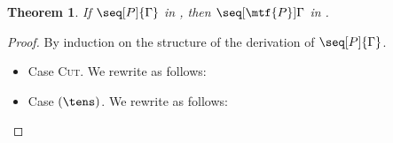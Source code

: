 \documentclass[submission,copyright,creativecommons]{eptcs}
\newtheorem{theorem}{Theorem}
\begin{document}
\begin{theorem}\label{thm:cp2hcp-typing}
  If $\seq[P]{\Gamma}$ in \cp, then $\seq[\mtf{P}]{\Gamma}$ in \hcp.
\end{theorem}
\begin{proof}
  By induction on the structure of the derivation of $\seq[P]{\Gamma}$.
    \begin{itemize}
  \item 
    Case \textsc{Cut}.
    We rewrite as follows:
    \begin{center}
    \end{center}
  \item
    Case $(\tens)$.
    We rewrite as follows:
    \begin{center}
\end{center}
\end{itemize}
\end{proof}
\end{document}
